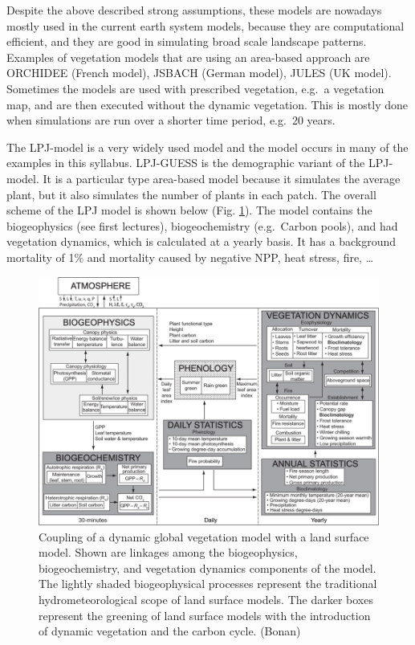 \documentclass[12pt,oneside]{book}
\begin{document}
Despite the above described strong assumptions, these models are
nowadays mostly used in the current earth system models, because they
are computational efficient, and they are good in simulating broad scale
landscape patterns. Examples of vegetation models that are using an
area-based approach are ORCHIDEE (French model), JSBACH (German model),
JULES (UK model). Sometimes the models are used with prescribed
vegetation, e.g.~a vegetation map, and are then executed without the
dynamic vegetation. This is mostly done when simulations are run over a
shorter time period, e.g.~20 years.

The LPJ-model is a very widely used model and the model occurs in many
of the examples in this syllabus. LPJ-GUESS is the demographic variant
of the LPJ-model. It is a particular type area-based model because it
simulates the average plant, but it also simulates the number of plants
in each patch. The overall scheme of the LPJ model is shown below (Fig.
\ref{fig:f64}). The model contains the biogeophysics (see first
lectures), biogeochemistry (e.g.~Carbon pools), and had vegetation
dynamics, which is calculated at a yearly basis. It has a background
mortality of 1\% and mortality caused by negative NPP, heat stress,
fire, \ldots{}

\begin{figure}

{\centering \includegraphics[width=0.8\linewidth]{figures/chap6/f64_LPJ_fllowchart} 

}

\caption{Coupling of a dynamic global vegetation model with a land surface model. Shown are linkages among the biogeophysics, biogeochemistry, and vegetation dynamics components of the model. The lightly shaded biogeophysical processes represent the traditional hydrometeorological scope of land surface models. The darker boxes represent the greening of land surface models with the introduction of dynamic vegetation and the carbon cycle. (Bonan)}\label{fig:f64}
\end{figure}
\end{document}
